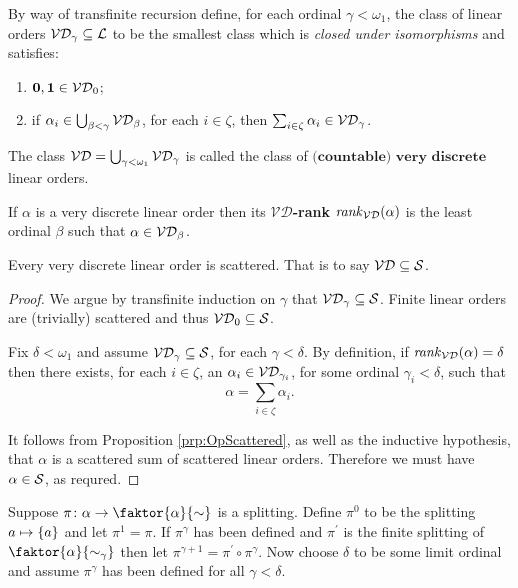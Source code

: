 \begin{dfn}
		By way of transfinite recursion define, for each ordinal
		$\gamma<\omega_1$, the class of linear orders
		$\mathcal{VD}_{\gamma}\subseteq\mathcal{L}$ to be the smallest class which is
		\textit{closed under isomorphisms} and satisfies:
        \begin{enumerate}
            \item   $\mathbf{0},\mathbf{1}\in\mathcal{VD}_0$;
			\item   if $\alpha_i\in\bigcup_{\beta<\gamma}\mathcal{VD}_{\beta}$, for each
				$i\in \zeta$, then $\sum_{i\in\zeta}\alpha_i\in\mathcal{VD}_\gamma$.
        \end{enumerate}
		The class $\mathcal{VD}=\bigcup_{\gamma<\omega_1}\mathcal{VD}_\gamma$ is called the class
		of $\textbf{(countable) very discrete}$ linear orders.
\end{dfn}

\begin{dfn}[$\VD$-rank]
		If $\alpha$ is a very discrete linear order then its
		$\bm{\mathcal{VD}}$\textbf{-rank} $\mathit{rank}_\mathcal{VD}(\alpha)$ is the least ordinal
		$\beta$ such that $\alpha\in\mathcal{VD}_{\beta}$.
\end{dfn}

\begin{lem}\label{prp:vdsct}
	Every very discrete linear order is scattered.  That is to say
	$\mathcal{VD}\subseteq\mathcal{S}$.
\end{lem}
\begin{proof}
	We argue by transfinite induction on $\gamma$ that
	$\mathcal{VD}_\gamma\subseteq\mathcal{S}$.  Finite linear orders are (trivially)
	scattered and thus $\mathcal{VD}_0\subseteq\mathcal{S}$.

	Fix $\delta<\omega_1$ and assume $\mathcal{VD}_\gamma\subseteq\mathcal{S}$, for each
	$\gamma<\delta$.  By definition, if $\mathit{rank}_\mathcal{VD}(\alpha)=\delta$ then there
	exists, for each $i\in\zeta$, an $\alpha_i\in\mathcal{VD}_{\gamma_i}$, for some
	ordinal
	$\gamma_i<\delta$, such that
	\begin{equation}
		\alpha=\sum_{i\in\zeta}\alpha_i.
	\end{equation}

	It follows from Proposition \ref{prp:OpScattered}, as well as the
	inductive hypothesis, that $\alpha$ is a scattered sum of scattered linear
	orders.  Therefore we must have $\alpha\in\mathcal{S}$, as requred.
\end{proof}

Suppose $\pi\colon\alpha\to\faktor{\alpha}{\sim}$ is a splitting. Define $\pi^0$
to be the splitting $a\mapsto\left\lbrace a\right\rbrace$ and let $\pi^1=\pi$.  If $\pi^\gamma$ has
been defined and $\pi^\prime$ is the finite splitting of
$\faktor{\alpha}{\sim_\gamma}$ then let
$\pi^{\gamma+1}=\pi^\prime\circ\pi^\gamma$.  Now choose $\delta$ to be some
limit ordinal and assume $\pi^\gamma$ has been defined for all $\gamma<\delta$.

